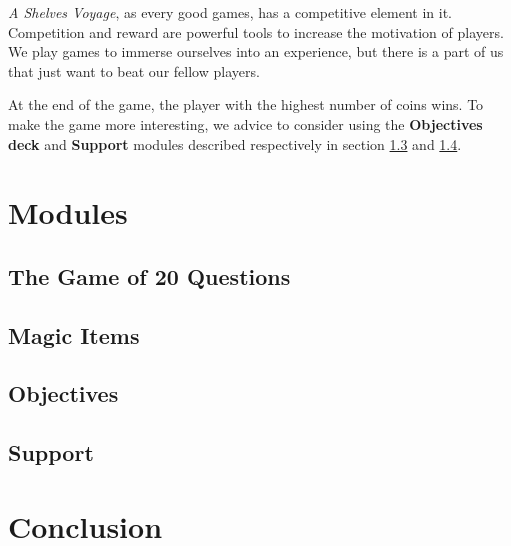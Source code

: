 \documentclass[12pt,a4paper]{book}
\theoremstyle{definition}
\begin{document}
\textit{A Shelves Voyage}, as every good games, has a competitive element in it. Competition and reward are powerful tools to increase the motivation of players. We play games to immerse ourselves into an experience, but there is a part of us that just want to beat our fellow players. 

At the end of the game, the player with the highest number of coins wins. To make the game more interesting, we advice to consider using the \textbf{Objectives deck} and \textbf{Support} modules described respectively in section \ref{objective-deck} and \ref{support}.  

\newpage

\section{Modules}

\subsection{The Game of 20 Questions}\label{game-of-20-questions}

\subsection{Magic Items}\label{magic-item-deck}

\subsection{Objectives}\label{objective-deck}

\subsection{Support}\label{support}



\section{Conclusion}
\end{document}
